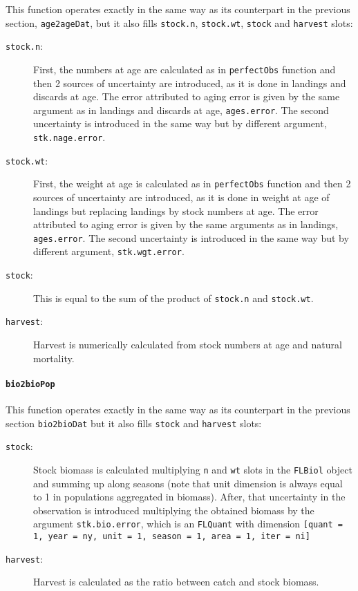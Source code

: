 	This function operates exactly in the same way as its counterpart in the previous section, \texttt{age2ageDat},
	but it also fills \texttt{stock.n}, \texttt{stock.wt}, \texttt{stock} and  \texttt{harvest} slots:

	\begin{description}
		\item[\texttt{stock.n}:] First, the numbers at age are calculated as in \texttt{perfectObs} function and then 2 sources 
			of uncertainty are introduced, as it is done in landings and discards at age. The error attributed to aging error
			is given by the same argument as in landings and discards at age, \texttt{ages.error}. The second uncertainty 
			is introduced in the same way but by different argument, \texttt{stk.nage.error}.
		\item[\texttt{stock.wt}:] First, the weight at age is calculated as in \texttt{perfectObs} function and then 2 sources 
			of uncertainty are introduced, as it is done in weight at age of landings but replacing landings by stock numbers at age. 
			The error attributed to aging error is given by the same arguments as in landings, \texttt{ages.error}. The second uncertainty 
			is introduced in the same way but by different argument, \texttt{stk.wgt.error}.
		\item[\texttt{stock}:] This is equal to the sum of the product of \texttt{stock.n} and \texttt{stock.wt}.
		\item[\texttt{harvest}:] Harvest is numerically calculated from stock numbers at age and natural mortality. 
	\end{description}


\paragraph{\texttt{bio2bioPop}} \hspace{0pt} \smallskip

	This function operates exactly in the same way as its counterpart in the previous section \texttt{bio2bioDat}
	but it also fills \texttt{stock} and  \texttt{harvest} slots:

	\begin{description}
		\item[\texttt{stock}:] Stock biomass is calculated multiplying \texttt{n} and \texttt{wt} slots in the \texttt{FLBiol}
			object and summing up along seasons (note that unit dimension is always equal to 1 in populations aggregated in biomass).
			After, that uncertainty in the observation is introduced multiplying the obtained biomass by the argument 
			\texttt{stk.bio.error}, which is an \texttt{FLQuant} with dimension 
			\texttt{[quant = 1, year = ny, unit = 1, season = 1, area = 1, iter = ni]}
		\item[\texttt{harvest}:] Harvest is calculated as the ratio between catch and stock biomass.
	\end{description}


